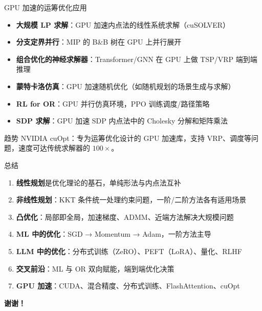 \documentclass[11pt, aspectratio=169, svgnames, table, fontset=fandol]{ctexbeamer}
\begin{document}
\begin{frame}{GPU 加速的运筹优化应用}
  \begin{itemize}
    \item \textbf{大规模 LP 求解}：GPU 加速内点法的线性系统求解（cuSOLVER）
    \item \textbf{分支定界并行}：MIP 的 B\&B 树在 GPU 上并行展开
    \item \textbf{组合优化的神经求解器}：Transformer/GNN 在 GPU 上做 TSP/VRP 端到端推理
    \item \textbf{蒙特卡洛仿真}：GPU 加速随机优化（如随机规划的场景生成与求解）
    \item \textbf{RL for OR}：GPU 并行仿真环境，PPO 训练调度/路径策略
    \item \textbf{SDP 求解}：GPU 加速 SDP 内点法中的 Cholesky 分解和矩阵乘法
  \end{itemize}

  \vspace{8pt}
  \begin{block}{趋势}
    NVIDIA cuOpt：专为运筹优化设计的 GPU 加速库，支持 VRP、调度等问题，速度可达传统求解器的 $100\times$。
  \end{block}
\end{frame}


\begin{frame}{总结}
  \begin{enumerate}
    \item \textbf{线性规划}是优化理论的基石，单纯形法与内点法互补
    \item \textbf{非线性规划}：KKT 条件统一处理约束问题，一阶/二阶方法各有适用场景
    \item \textbf{凸优化}：局部即全局，加速梯度、ADMM、近端方法解决大规模问题
    \item \textbf{ML 中的优化}：SGD → Momentum → Adam，一阶方法主导
    \item \textbf{LLM 中的优化}：分布式训练（ZeRO）、PEFT（LoRA）、量化、RLHF
    \item \textbf{交叉前沿}：ML 与 OR 双向赋能，端到端优化决策
    \item \textbf{GPU 加速}：CUDA、混合精度、分布式训练、FlashAttention、cuOpt
  \end{enumerate}

  \vspace{12pt}
  \begin{center}
    \Large \textbf{谢谢！}
  \end{center}
\end{frame}
\end{document}
